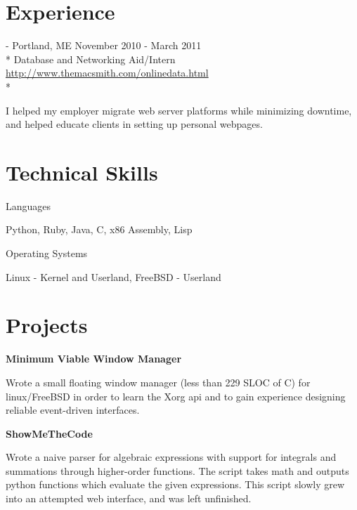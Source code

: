 \documentclass[letter,margin,line]{resume}
\newcommand{\rurl}[1]{\hfill {\footnotesize \url{#1}}}
\newcommand{\rdate}[1]{\hfill {\small #1}}
\renewcommand{\employer}[5]{\item[#1] - #2 \rdate{#3} \\* #4 \rurl{#5} \\*}
\begin{document}
\begin{resume}
\section{\mysidestyle Experience}
	\begin{asparadesc}
		\employer{MacSmith}{Portland, ME}{November 2010 - March 2011}{Database and Networking Aid/Intern}{http://www.themacsmith.com/onlinedata.html}
		\item\small I helped my employer migrate web server platforms while minimizing downtime, and helped educate clients in setting up personal webpages.
		\normalsize
		\\	
	\end{asparadesc}

\section{\mysidestyle Technical Skills}
	\begin{compactdesc}
		\item[Languages]
			\small\item Python, Ruby, Java, C, x86 Assembly, Lisp 
		\item[Operating Systems]
			\small\item Linux - Kernel and Userland, FreeBSD - Userland
	\end{compactdesc}
	
	
\section{\mysidestyle Projects}
	\begin{asparablank}
		\item {\bf Minimum Viable Window Manager}
		
		\small Wrote a small floating window manager (less than 229 SLOC of C) for linux/FreeBSD in order to learn the Xorg api and to gain experience designing reliable event-driven interfaces. 
		\normalsize
		\\
		
		\item {\bf ShowMeTheCode}
		
		\small Wrote a naive parser for algebraic expressions with support for integrals and summations through higher-order functions. The script takes math and outputs python functions which evaluate the given expressions. This script slowly grew into an attempted web interface, and was left unfinished.
		\normalsize		
		\\


\end{asparablank}
\end{resume}
\end{document}
